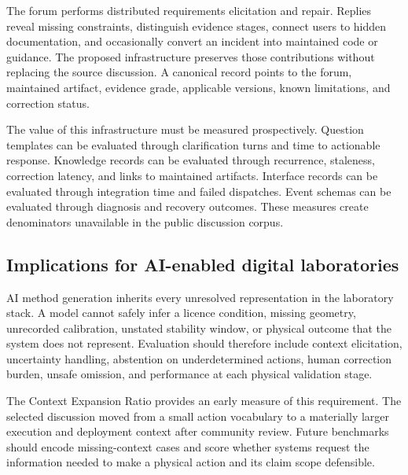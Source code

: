 The forum performs distributed requirements elicitation and repair. Replies reveal missing constraints, distinguish evidence stages, connect users to hidden documentation, and occasionally convert an incident into maintained code or guidance. The proposed infrastructure preserves those contributions without replacing the source discussion. A canonical record points to the forum, maintained artifact, evidence grade, applicable versions, known limitations, and correction status.

The value of this infrastructure must be measured prospectively. Question templates can be evaluated through clarification turns and time to actionable response. Knowledge records can be evaluated through recurrence, staleness, correction latency, and links to maintained artifacts. Interface records can be evaluated through integration time and failed dispatches. Event schemas can be evaluated through diagnosis and recovery outcomes. These measures create denominators unavailable in the public discussion corpus.

\subsection{Implications for AI-enabled digital laboratories}

AI method generation inherits every unresolved representation in the laboratory stack. A model cannot safely infer a licence condition, missing geometry, unrecorded calibration, unstated stability window, or physical outcome that the system does not represent. Evaluation should therefore include context elicitation, uncertainty handling, abstention on underdetermined actions, human correction burden, unsafe omission, and performance at each physical validation stage.

The Context Expansion Ratio provides an early measure of this requirement. The selected discussion moved from a small action vocabulary to a materially larger execution and deployment context after community review. Future benchmarks should encode missing-context cases and score whether systems request the information needed to make a physical action and its claim scope defensible.
